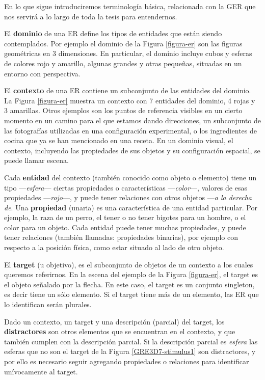 En lo que sigue introduciremos terminolog\'ia b\'asica, relacionada con la GER que nos servir\'a a lo largo de toda la tesis para entendernos.

El {\bf dominio} de una ER define los tipos de entidades que est\'an siendo contemplados. Por ejemplo el dominio de la Figura \ref{figura-er} son las figuras geom\'etricas en 3 dimensiones. En particular, el dominio incluye cubos y esferas de colores rojo y amarillo, algunas grandes y otras peque\~nas, situadas en un entorno con perspectiva.

El {\bf contexto} de una ER contiene un subconjunto de las entidades del dominio. La Figura \ref{figura-er} muestra un contexto con 7 entidades del dominio, 4 rojas y 3 amarillas. Otros ejemplos son los puntos de referencia visibles en un cierto momento en un camino para el que estamos dando direcciones, un subconjunto de las fotograf\'ias utilizadas en una configuraci\'on experimental, o los ingredientes de cocina que ya se han mencionado en una receta. En un dominio visual, el contexto, incluyendo las propiedades de sus objetos y su configuraci\'on espacial, se puede llamar escena. %

Cada {\bf entidad} del contexto (tambi\'en conocido como objeto o elemento) tiene un tipo ---\emph{esfera}--- ciertas propiedades o caracter\'isticas ---\emph{color}---, valores de esas propiedades ---\emph{rojo}---, y puede tener relaciones con otros objetos ---\emph{a la derecha de}. Una {\bf propiedad} (unaria) es una caracter\'istica de una entidad particular. Por ejemplo, la raza de un perro, el tener o no tener bigotes para un hombre, o el color para un objeto. Cada entidad puede tener muchas propiedades, y puede tener relaciones (tambi\'en llamadas: propiedades binarias), por ejemplo con respecto a la posici\'on f\'isica, como estar situado al lado de otro objeto. 

El {\bf target} (u objetivo), es el subconjunto de objetos de un contexto a los cuales queremos referirnos. En la escena del ejemplo de la Figura \ref{figura-er}, el target es el objeto se\~nalado por la flecha. En este caso, el target es un conjunto singleton, es decir tiene un s\'olo elemento. Si el target tiene m\'as de un elemento, las ER que lo identifican ser\'an plurales.

Dado un contexto, un target y una descripci\'on (parcial) del target, los {\bf distractores} son otros elementos que se encuentran en el contexto, y que tambi\'en cumplen con la descripci\'on parcial. Si la descripci\'on parcial es {\it esfera} las esferas que no son el target de la Figura \ref{GRE3D7-stimulus1} son  distractores, y por ello es necesario seguir agregando propiedades o relaciones para identificar un\'ivocamente al target.

